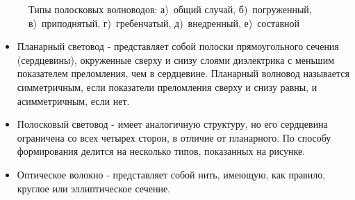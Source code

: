 \begin{figure}[h!]
	\begin{minipage}[h]{0.32\linewidth}
	\end{minipage}
	\hfill
	\begin{minipage}[h]{0.32\linewidth}
	\end{minipage}
	\hfill
	\begin{minipage}[h]{0.32\linewidth}
	\end{minipage}
	\vfill
	\begin{minipage}[h]{0.32\linewidth}
	\end{minipage}
	\hfill
	\begin{minipage}[h]{0.32\linewidth}
	\end{minipage}
	\hfill
	\begin{minipage}[h]{0.32\linewidth}
	\end{minipage}	
	\caption{Типы полосковых волноводов: а)~общий случай, б)~погруженный, в)~приподнятый, г)~гребенчатый, д)~внедренный, е)~составной}
	\label{planars}
\end{figure}

\begin{itemize}
\item Планарный световод - представляет собой полоски прямоугольного сечения (сердцевины), окруженные сверху и снизу слоями диэлектрика с меньшим показателем преломления, чем в сердцевине. Планарный волновод называется симметричным, если показатели преломления сверху и снизу равны, и асимметричным, если нет.
\item Полосковый световод - имеет аналогичную структуру, но его сердцевина ограничена со всех четырех сторон, в отличие от планарного. По способу формирования делится на несколько типов, показанных на рисунке.
\item Оптическое волокно - представляет собой нить, имеющую, как правило, круглое или эллиптическое сечение.
\end{itemize} 


